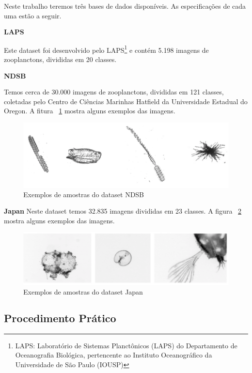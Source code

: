 Neste trabalho teremos três bases de dados disponíveis. As especificações de cada uma estão a seguir.

\textbf{LAPS}

Este dataset foi desenvolvido pelo LAPS\footnote{LAPS: Laboratório de Sistemas Planctônicos (LAPS) do Departamento de Oceanografia Biológica, pertencente ao Instituto Oceanográfico da Universidade de São Paulo (IOUSP)} e contém 5.198 imagens de zooplanctons, divididas em 20 classes.

\textbf{NDSB}

Temos cerca de 30.000 imagens de zooplanctons, divididas em 121 classes, coletadas pelo Centro de Ciências Marinhas Hatfield da Universidade Estadual do Oregon. A fitura ~\ref{fig:ndsb} mostra alguns exemplos das imagens.

\begin{figure}
  \centering
  \includegraphics[width=1.0\textwidth]{figures/ndsb_exemplos.png}
  \caption{Exemplos de amostras do dataset NDSB}
  \label{fig:ndsb}
\end{figure}

\textbf{Japan}
Neste dataset temos 32.835 imagens divididas em 23 classes. A figura ~\ref{fig:japan} mostra alguns exemplos das imagens.


\begin{figure}
  \centering
  \includegraphics[width=1.1\textwidth]{figures/japan_exemplos.png}
  \caption{Exemplos de amostras do dataset Japan}
  \label{fig:japan}
\end{figure}




\subsection{Procedimento Prático} 
\label{sec:procedimento_pratico}

